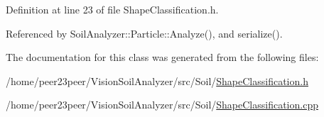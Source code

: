 Definition at line 23 of file Shape\+Classification.\+h.



Referenced by Soil\+Analyzer\+::\+Particle\+::\+Analyze(), and serialize().



The documentation for this class was generated from the following files\+:\begin{DoxyCompactItemize}
\item 
/home/peer23peer/\+Vision\+Soil\+Analyzer/src/\+Soil/\hyperlink{_shape_classification_8h}{Shape\+Classification.\+h}\item 
/home/peer23peer/\+Vision\+Soil\+Analyzer/src/\+Soil/\hyperlink{_shape_classification_8cpp}{Shape\+Classification.\+cpp}\end{DoxyCompactItemize}
